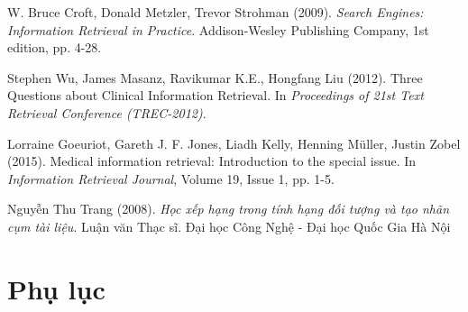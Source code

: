 \documentclass[11pt,a4paper,oneside]{book}
\begin{document}
\newpage
\renewcommand{\refname}{Tài liệu tham khảo}
\begin{thebibliography}{80}

 W. Bruce Croft, Donald Metzler, Trevor Strohman (2009). \textit{Search Engines: Information Retrieval in Practice}. Addison-Wesley Publishing Company, 1st edition, pp. 4-28.

 Stephen Wu, James Masanz, Ravikumar K.E., Hongfang Liu (2012). Three Questions about Clinical Information Retrieval. In \textit{ Proceedings of 21st Text Retrieval Conference (TREC-2012)}.

 Lorraine Goeuriot, Gareth J. F. Jones, Liadh Kelly, Henning Müller, Justin Zobel (2015). Medical information retrieval: Introduction to the special issue. In \textit{Information Retrieval Journal}, Volume 19, Issue 1, pp. 1-5.

 Nguyễn Thu Trang (2008). \textit{Học xếp hạng trong tính hạng đối tượng và tạo nhãn cụm tài liệu}. Luận văn Thạc sĩ. Đại học Công Nghệ - Đại học Quốc Gia Hà Nội

\end{thebibliography}

\chapter*{Phụ lục} 
\end{document}
